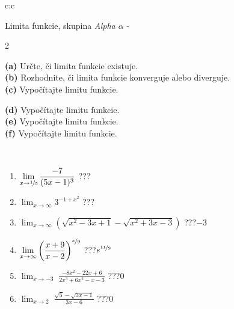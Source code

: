 \documentclass[10pt]{report}
\begin{document}
\thispagestyle{empty}
\begin{tabular}{c:c}
\begin{minipage}[c][104.5mm][t]{0.5\linewidth}
\begin{center}
\vspace{7mm}
{\huge Limita funkcie, skupina \textit{Alpha $\alpha$} -}\\[5mm]
\begin{minipage}{0.95\linewidth}
\begin{center}
{\small \begin{multicols}{2} \raggedright
\textbf{(a)} Určte, či limita funkcie existuje. \\[1mm]
\textbf{(b)} Rozhodnite, či limita funkcie konverguje alebo diverguje. \\[1mm]
\textbf{(c)} Vypočítajte limitu funkcie. \par \columnbreak
\textbf{(d)} Vypočítajte limitu funkcie. \\[1mm]
\textbf{(e)} Vypočítajte limitu funkcie. \\[1mm]
\textbf{(f)} Vypočítajte limitu funkcie. \\[1mm]
\end{multicols}
}
\end{center}
\end{minipage}
\\[4mm]
\begin{minipage}{0.79\linewidth}
\begin{center}
\begin{varwidth}{\linewidth}
\begin{enumerate}
\normalsize
\item $\displaystyle\lim_{x\to\nicefrac{1}{5}}{\frac{-7}{(5x-1)^{3}}}$\quad \dotfill\; ???\;\dotfill \quad {}
\item $\displaystyle\lim_{x\to\infty}{3^{-1+x^2}}$\quad \dotfill\; ???\;\dotfill \quad {}
\item $\displaystyle\lim_{x\to\infty}{\left(\sqrt{x^2-3x+1} - \sqrt{x^2+3x-3}\right)}$\quad \dotfill\; ???\;\dotfill \quad $-3$
\item $\displaystyle\lim_{x\to\infty}{\left( \frac{x+9}{x-2} \right)^{\nicefrac{x}{9}}}$\quad \dotfill\; ???\;\dotfill \quad $e^{\nicefrac{11}{9}}$
\item $\displaystyle\lim_{x\to -3}{\;\frac{-8x^2-22x+6}{2x^3+6x^2-x-3}}$\quad \dotfill\; ???\;\dotfill \quad $0$
\item $\displaystyle\lim_{x\to 2}{\;\frac{\sqrt{5}-\sqrt{3x-1}}{3x-6}}$\quad \dotfill\; ???\;\dotfill \quad $0$

\end{enumerate}
\end{varwidth}
\end{center}
\end{minipage}
\end{center}
\end{minipage}
\end{tabular}
\end{document}
